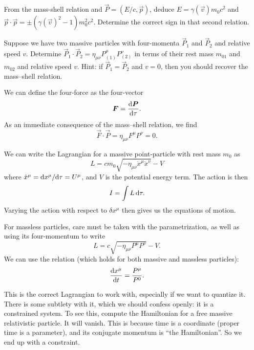\begin{exercise}
From the mass-shell relation and $\vec{P} = (E/c, \vec{p})$, deduce
$E = \gamma(\vec{v})m_{0}c^{2}$ and 
$\vec{p}\cdot\vec{p}=\pm(\gamma(\vec{v})^{2}-1)m_{0}^{2}c^{2}$.
Determine the correct sign in that second relation.
\end{exercise}

\begin{exercise}
Suppose we have two massive particles with four-momenta $\vec{P}_{1}$
and $\vec{P}_{2}$ and relative speed $v$. Determine
$\vec{P}_{1}\cdot\vec{P}_{2}=\eta_{\mu\nu}P^{\mu}_{(1)}P^{\nu}_{(2)}$ in
terms of their rest mass $m_{01}$ and $m_{02}$ and relative speed $v$.
Hint: if $\vec{P}_{1}=\vec{P}_{2}$ and $v=0$, then you should recover
the mass--shell relation.
\end{exercise}

We can define the four-force as the four-vector
\begin{equation}
\boldsymbol{F} = \frac{\mathrm{d}\boldsymbol{P}}{\mathrm{d}\tau}.
\end{equation}
As an immediate consequence of the mass--shell relation, we find
\begin{equation}
\vec{F}\cdot\vec{P} = \eta_{\mu\nu}F^{\mu}P^{\nu} = 0.
\end{equation}

We can write the Lagrangian for a massive point-particle with rest mass
$m_{0}$ as
\begin{equation}
L = cm_{0}\sqrt{-\eta_{\mu\nu}\dot{x}^{\mu}\dot{x}^{\nu}} - V
\end{equation}
where $\dot{x}^{\mu} = \mathrm{d} x^{\mu}/\mathrm{d}\tau = U^{\mu}$, and $V$ is the potential
energy term. The action is then 
\begin{equation}
I = \int L\,\mathrm{d}\tau.
\end{equation}
Varying the action with respect to $\delta x^{\mu}$ then gives us the
equations of motion.

For massless particles, care must be taken with the parametrization, as
well as using its four-momentum to write
\begin{equation}
L = c\sqrt{-\eta_{\mu\nu}P^{\mu}P^{\nu}} - V.
\end{equation}
We can use the relation (which holds for both massive and massless particles):
\begin{equation}
\frac{\mathrm{d} x^{\mu}}{\mathrm{d} t} = \frac{P^{\mu}}{P^{0}}.
\end{equation}

\begin{danger}
This is the correct Lagrangian to work with, especially if we want to
quantize it. There is some subtlety with it, which we should confess
openly: it is a constrained system. To see this, compute the Hamiltonian
for a free massive relativistic particle. It will vanish. This is
because time is a coordinate (proper time is a parameter), and its
conjugate momentum is ``the Hamiltonian''. So we end up with a
constraint. 
\end{danger}


